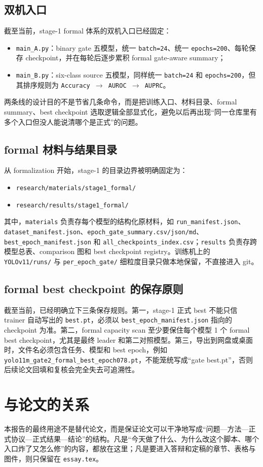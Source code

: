 \documentclass[UTF8,12pt]{ctexart}
\begin{document}
\subsection{双机入口}
截至当前，stage-1 formal 体系的双机入口已经固定：
\begin{itemize}
    \item \texttt{main\_A.py}：binary gate 五模型，统一 \texttt{batch=24}、统一 \texttt{epochs=200}、每轮保存 checkpoint，并在每轮后逐步累积 formal gate-aware summary；
    \item \texttt{main\_B.py}：six-class source 五模型，同样统一 \texttt{batch=24} 和 \texttt{epochs=200}，但其排序规则为 \texttt{Accuracy $\rightarrow$ AUROC $\rightarrow$ AUPRC}。
\end{itemize}
两条线的设计目的不是节省几条命令，而是把训练入口、材料目录、formal summary、best checkpoint 选取逻辑全部显式化，避免以后再出现“同一仓库里有多个入口但没人能说清哪个是正式”的问题。

\subsection{formal 材料与结果目录}
从 formalization 开始，stage-1 的目录边界被明确固定为：
\begin{itemize}
    \item \texttt{research/materials/stage1\_formal/}
    \item \texttt{research/results/stage1\_formal/}
\end{itemize}
其中，\texttt{materials} 负责存每个模型的结构化原材料，如 \texttt{run\_manifest.json}、\texttt{dataset\_manifest.json}、\texttt{epoch\_gate\_summary.csv/json/md}、\texttt{best\_epoch\_manifest.json} 和 \texttt{all\_checkpoints\_index.csv}；\texttt{results} 负责存跨模型总表、comparison 图和 best checkpoint registry。训练机上的 \texttt{YOLOv11/runs/} 与 \texttt{per\_epoch\_gate/} 细粒度目录只做本地保留，不直接进入 git。

\subsection{formal best checkpoint 的保存原则}
截至当前，已经明确立下三条保存规则。第一，stage-1 正式 best 不能只信 trainer 自动写出的 \texttt{best.pt}，必须以 \texttt{best\_epoch\_manifest.json} 指向的 checkpoint 为准。第二，formal capacity scan 至少要保住每个模型 1 个 formal best checkpoint，尤其是最终 leader 和第二对照模型。第三，导出到网盘或桌面时，文件名必须包含任务、模型和 best epoch，例如 \texttt{yolo11m\_gate2\_formal\_best\_epoch078.pt}，不能笼统写成“gate best.pt”，否则后续论文回填和复核会完全失去可追溯性。

\section{与论文的关系}
本报告的最终用途不是替代论文，而是保证论文可以干净地写成“问题—方法—正式协议—正式结果—结论”的结构。凡是“今天做了什么、为什么改这个脚本、哪个入口炸了又怎么修”的内容，都放在这里；凡是要进入答辩和定稿的章节、表格与图件，则只保留在 \texttt{essay.tex}。
\end{document}
